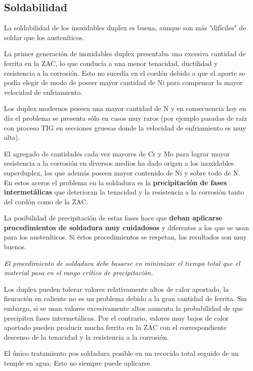 \subsection{Soldabilidad}

La soldabilidad de los inoxidables duplex es buena, aunque son más "difíciles" de soldar que los austeníticos. 

La primer generación de inoxidables duplex presentaba una excesiva cantidad de ferrita en la ZAC, lo que conducía a una menor tenacidad, ductilidad y resistencia a la corrosión. Esto no sucedía en el cordón debido a que el aporte se podía elegir de modo de poseer mayor cantidad de Ni para compensar la mayor velocidad de enfriamiento. 

Los duplex modernos poseen una mayor cantidad de N y en consecuencia hoy en día el problema se presenta sólo en casos muy raros (por ejemplo pasadas de raíz con proceso TIG en secciones gruesas donde la velocidad de enfriamiento es muy alta).

El agregado de cantidades cada vez mayores de Cr y Mo para lograr mayor resistencia a la corrosión en diversos medios ha dado origen a los inoxidables superduplex, los que además poseen mayor contenido de Ni y sobre todo de N. En estos aceros el problema en la soldadura es la \textbf{precipitación de fases intermetálicas} que deterioran la tenacidad y la resistencia a la corrosión tanto del cordón como de la ZAC.

La posibilidad de precipitación de estas fases hace que \textbf{deban aplicarse procedimientos de soldadura muy cuidadosos }y diferentes a los que se usan para los austeníticos. Si éstos procedimientos se respetan, los resultados son muy buenos. 

{\it El procedimiento de soldadura debe basarse en minimizar el tiempo total que el material pasa en el rango crítico de precipitación.}

Los duplex pueden tolerar valores relativamente altos de calor aportado, la fisuración en caliente no es un problema debido a la gran cantidad de ferrita. Sin embargo, si se usan valores excesivamente altos aumenta la probabilidad de que precipiten fases intermetálicas. Por el contrario, valores muy bajos de calor aportado pueden producir mucha ferrita en la ZAC con el correspondiente descenso de la tenacidad y la resistencia a la corrosión.

El único tratamiento pos soldadura posible en un recocido total seguido de un temple en agua. Esto no siempre puede aplicarse. 

